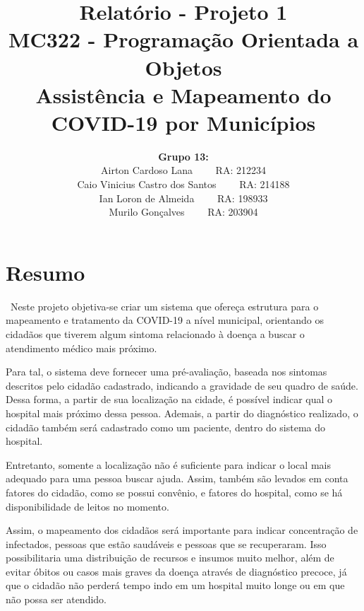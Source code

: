 \documentclass[10pt]{article}
\begin{document}
\title{Relatório - Projeto 1\\
 	   MC322 - Programação Orientada a Objetos\\
 	   \textbf{Assistência e Mapeamento do COVID-19 por Municípios}
}
 	   
\author{\textbf{Grupo 13:}\\
		Airton Cardoso Lana \ \ \ \ RA: 212234\\
		Caio Vinicius Castro dos Santos \ \ \ \ RA: 214188\\
		Ian Loron de Almeida \ \ \ \ RA: 198933\\
		Murilo Gonçalves \ \ \ \ RA: 203904\\
}
\date{}

\maketitle

\section{Resumo}

\hspace{3em}\ Neste projeto objetiva-se criar um sistema que ofereça estrutura para o mapeamento e tratamento da COVID-19 a nível municipal, orientando os cidadãos que tiverem algum sintoma relacionado à doença a buscar o atendimento médico mais próximo. 

\hspace{2em}Para tal, o sistema deve fornecer uma pré-avaliação, baseada nos sintomas descritos pelo cidadão cadastrado, indicando a gravidade de seu quadro de saúde. Dessa forma, a partir de sua localização na cidade, é possível indicar qual o hospital mais próximo dessa pessoa. Ademais, a partir do diagnóstico realizado, o cidadão também será cadastrado como um paciente, dentro do sistema do hospital.

\hspace{2em}Entretanto, somente a localização não é suficiente para indicar o local mais adequado para uma pessoa buscar ajuda. Assim, também são levados em conta fatores do cidadão, como se possui convênio, e fatores do hospital, como se há disponibilidade de leitos no momento.

\hspace{2em}Assim, o mapeamento dos cidadãos será importante para indicar concentração de infectados, pessoas que estão saudáveis e pessoas que se recuperaram. Isso possibilitaria uma distribuição de recursos e insumos muito melhor, além de evitar óbitos ou casos mais graves da doença através de diagnóstico precoce, já que o cidadão não perderá tempo indo em um hospital muito longe ou em que não possa ser atendido.
\end{document}
